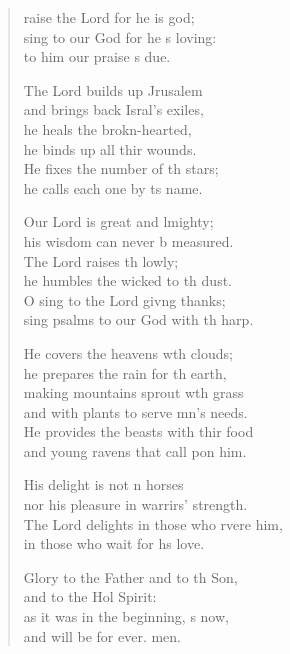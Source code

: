 \begin{verse}
  \begin{patverse}
raise the Lord for he is god;\Flex\\
sing to our God for he \pointup{\i}s loving:\Med\\
to him our praise \pointup{\i}s due.

The Lord builds up Jrusalem\Med\\
and brings back Isral’s exiles,\\
he heals the brokn-hearted,\Med\\
he binds up all thir wounds.\\
He fixes the number of th stars;\Med\\
he calls each one by \pointup{\i}ts name.

Our Lord is great and lmighty;\Med\\
his wisdom can never b measured.\\
The Lord raises th lowly;\Med\\
he humbles the wicked to th dust.\\
O sing to the Lord giv\pointup{\i}ng thanks;\Med\\
sing psalms to our God with th harp.

He covers the heavens w\pointup{\i}th clouds;\Med\\
he prepares the rain for th earth,\\
making mountains sprout w\pointup{\i}th grass\Med\\
and with plants to serve mn’s needs.\\
He provides the beasts with thir food\Med\\
and young ravens that call pon him.

His delight is not \pointup{\i}n horses\Med\\
nor his pleasure in warrirs’ strength.\\
The Lord delights in those who rvere him,\Med\\
in those who wait for h\pointup{\i}s love.

Glory to the Father and to th Son,\Med\\
and to the Hol Spirit:\\
as it was in the beginning, \pointup{\i}s now,\Med\\
and will be for ever. men.
  \end{patverse}
  \end{verse}
